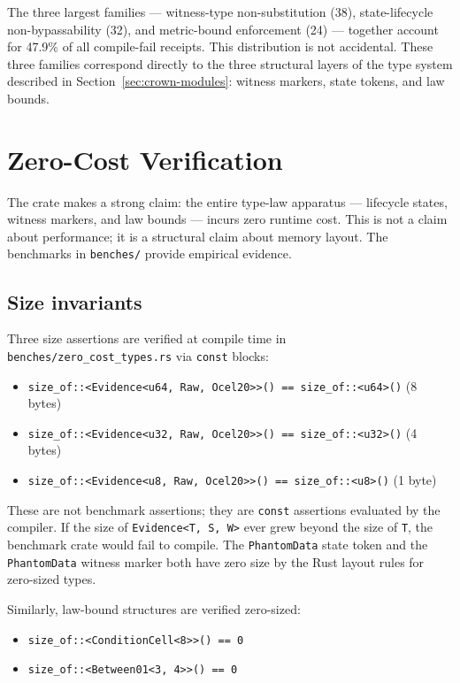 The three largest families --- witness-type non-substitution (38), state-lifecycle
non-bypassability (32), and metric-bound enforcement (24) --- together account
for 47.9\% of all compile-fail receipts. This distribution is not accidental.
These three families correspond directly to the three structural layers of the
type system described in Section~\ref{sec:crown-modules}: witness markers,
state tokens, and law bounds.

\section{Zero-Cost Verification}
\label{sec:crown-zerocost}

The crate makes a strong claim: the entire type-law apparatus --- lifecycle
states, witness markers, and law bounds --- incurs zero runtime cost. This is
not a claim about performance; it is a structural claim about memory layout.
The benchmarks in \texttt{benches/} provide empirical evidence.

\subsection{Size invariants}
\label{ssec:crown-sizes}

Three size assertions are verified at compile time in
\texttt{benches/zero\_cost\_types.rs} via \texttt{const} blocks:

\begin{itemize}
  \item \texttt{size\_of::<Evidence<u64, Raw, Ocel20>>() == size\_of::<u64>()} (8 bytes)
  \item \texttt{size\_of::<Evidence<u32, Raw, Ocel20>>() == size\_of::<u32>()} (4 bytes)
  \item \texttt{size\_of::<Evidence<u8, Raw, Ocel20>>()  == size\_of::<u8>()}  (1 byte)
\end{itemize}

These are not benchmark assertions; they are \texttt{const} assertions evaluated
by the compiler. If the size of \texttt{Evidence<T, S, W>} ever grew beyond the
size of \texttt{T}, the benchmark crate would fail to compile. The \texttt{PhantomData}
state token and the \texttt{PhantomData} witness marker both have zero size by
the Rust layout rules for zero-sized types.

Similarly, law-bound structures are verified zero-sized:

\begin{itemize}
  \item \texttt{size\_of::<ConditionCell<8>>() == 0}
  \item \texttt{size\_of::<Between01<3, 4>>() == 0}
\end{itemize}

